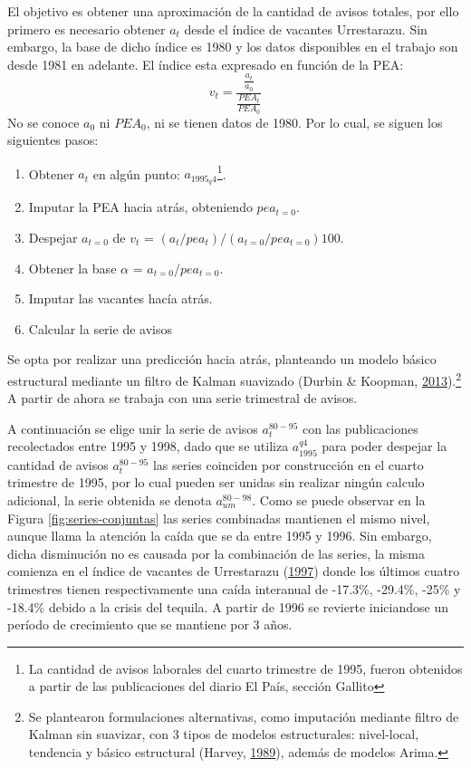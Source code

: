 \documentclass[12pt,oneside]{reedthesis}
\providecommand{\tightlist}{%
  \setlength{\itemsep}{0pt}\setlength{\parskip}{0pt}}
\begin{document}
El objetivo es obtener una aproximación de la cantidad de avisos totales, por ello primero es necesario obtener \(a_t\) desde el índice de vacantes Urrestarazu. Sin embargo, la base de dicho índice es 1980 y los datos disponibles en el trabajo son desde 1981 en adelante. El índice esta expresado en función de la PEA:
\begin{equation}
v_t = \frac{\frac{a_t}{a_0}}{\frac{PEA_t}{PEA_0}}
\end{equation}
No se conoce \(a_0\) ni \(PEA_0\), ni se tienen datos de 1980. Por lo cual, se siguen los siguientes pasos:
\begin{enumerate}
\def\labelenumi{\arabic{enumi}.}
\tightlist
\item
  Obtener \(a_t\) en algún punto: \(a_{1995_q4}\)\footnote{La cantidad de avisos laborales del cuarto trimestre de 1995, fueron obtenidos a partir de las publicaciones del diario El País, sección Gallito}.
\item
  Imputar la PEA hacia atrás, obteniendo \(pea_{t=0}\).
\item
  Despejar \(a_{t=0}\) de
  \(v_t\) = \((a_t/pea_t)/(a_{t=0}/pea_{t=0})100\).
\item
  Obtener la base \(\alpha\) = \(a_{t=0}\)/\(pea_{t=0}\).
\item
  Imputar las vacantes hacía atrás.
\item
  Calcular la serie de avisos
\end{enumerate}
Se opta por realizar una predicción hacia atrás, planteando un modelo básico estructural mediante un filtro de Kalman suavizado (Durbin \& Koopman, \protect\hyperlink{ref-Durbin2013}{2013}).\footnote{Se plantearon formulaciones alternativas, como imputación mediante filtro de Kalman sin suavizar, con 3 tipos de modelos estructurales: nivel-local, tendencia y básico estructural (Harvey, \protect\hyperlink{ref-Harvey1989}{1989}), además de modelos Arima.} A partir de ahora se trabaja con una serie trimestral de avisos.

A continuación se elige unir la serie de avisos \(a_t^{80-95}\) con las publicaciones recolectados entre 1995 y 1998, dado que se utiliza \(a_{1995}^{q4}\) para poder despejar la cantidad de avisos \(a_t^{80-95}\) las series coinciden por construcción en el cuarto trimestre de 1995, por lo cual pueden ser unidas sin realizar ningún calculo adicional, la serie obtenida se denota \(a_{um}^{80-98}\). Como se puede observar en la Figura \ref{fig:series-conjuntas} las series combinadas mantienen el mismo nivel, aunque llama la atención la caída que se da entre 1995 y 1996. Sin embargo, dicha disminución no es causada por la combinación de las series, la misma comienza en el índice de vacantes de Urrestarazu (\protect\hyperlink{ref-Urrestarazu1997}{1997}) donde los últimos cuatro trimestres tienen respectivamente una caída interanual de -17.3\%, -29.4\%, -25\% y -18.4\% debido a la crisis del tequila. A partir de 1996 se revierte iniciandose un período de crecimiento que se mantiene por 3 años.
\end{document}
